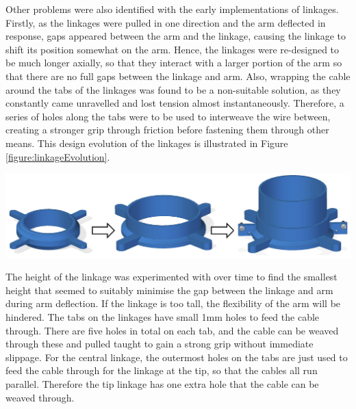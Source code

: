 \documentclass[11pt]{article}
\begin{document}
Other problems were also identified with the early implementations of linkages. Firstly, as the linkages were pulled in one direction and the arm deflected in response, gaps appeared between the arm and the linkage, causing the linkage to shift its position somewhat on the arm. Hence, the linkages were re-designed to be much longer axially, so that they interact with a larger portion of the arm so that there are no full gaps between the linkage and arm. Also, wrapping the cable around the tabs of the linkages was found to be a non-suitable solution, as they constantly came unravelled and lost tension almost instantaneously. Therefore, a series of holes along the tabs were to be used to interweave the wire between, creating a stronger grip through friction before fastening them through other means. This design evolution of the linkages is illustrated in Figure \ref{figure:linkageEvolution}.

\begin{center}
\includegraphics[width=\textwidth]{images/linkageEvolution.png}
\label{figure:linkageEvolution}
\end{center}



The height of the linkage was experimented with over time to find the smallest height that seemed to suitably minimise the gap between the linkage and arm during arm deflection. If the linkage is too tall, the flexibility of the arm will be hindered. The tabs on the linkages have small 1mm holes to feed the cable through. There are five holes in total on each tab, and the cable can be weaved through these and pulled taught to gain a strong grip without immediate slippage. For the central linkage, the outermost holes on the tabs are just used to feed the cable through for the linkage at the tip, so that the cables all run parallel. Therefore the tip linkage has one extra hole that the cable can be weaved through. 
\end{document}
